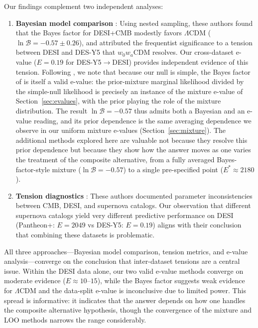 \documentclass[11pt,a4paper]{article}
\newcommand{\LCDM}{$\Lambda$CDM}
\begin{document}
Our findings complement two independent analyses:

\begin{enumerate}
    \item \textbf{Bayesian model comparison} \citep{OngBayesian2025}: Using nested sampling, these authors found that the Bayes factor for DESI+CMB modestly favors \LCDM{} ($\ln \mathcal{B} = -0.57 \pm 0.26$), and attributed the frequentist significance to a tension between DESI and DES-Y5 that $w_0w_a$CDM resolves. Our cross-dataset e-value ($E = 0.19$ for DES-Y5$\rightarrow$DESI) provides independent evidence of this tension. Following \citet{GrunwaldSafeTesting2024}, we note that because our null is simple, the Bayes factor of \citet{OngBayesian2025} is itself a valid e-value: the prior-mixture marginal likelihood divided by the simple-null likelihood is precisely an instance of the mixture e-value of Section~\ref{sec:evalues}, with the prior playing the role of the mixture distribution. The result $\ln \mathcal{B} = -0.57$ thus admits both a Bayesian and an e-value reading, and its prior dependence is the same averaging dependence we observe in our uniform mixture e-values (Section~\ref{sec:mixture}). The additional methods explored here are valuable not because they resolve this prior dependence but because they show how the answer moves as one varies the treatment of the composite alternative, from a fully averaged Bayes-factor-style mixture ($\ln \mathcal{B} = -0.57$) to a single pre-specified point ($E^{*} \approx 2180$).

    \item \textbf{Tension diagnostics} \citep{WangMota2025}: These authors documented parameter inconsistencies between CMB, DESI, and supernova catalogs. Our observation that different supernova catalogs yield very different predictive performance on DESI (Pantheon+: $E = 2049$ vs DES-Y5: $E = 0.19$) aligns with their conclusion that combining these datasets is problematic.
\end{enumerate}

All three approaches---Bayesian model comparison, tension metrics, and e-value analysis---converge on the conclusion that inter-dataset tensions are a central issue. Within the DESI data alone, our two valid e-value methods converge on moderate evidence ($E \approx 10$--$15$), while the Bayes factor suggests weak evidence for \LCDM{} and the data-split e-value is inconclusive due to limited power. This spread is informative: it indicates that the answer depends on how one handles the composite alternative hypothesis, though the convergence of the mixture and LOO methods narrows the range considerably.
\end{document}
